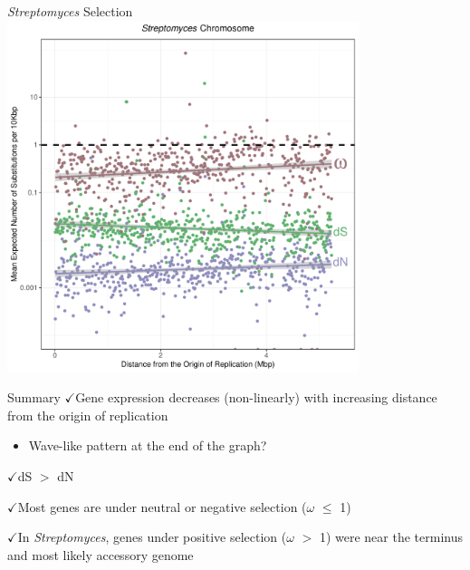 \documentclass{beamer}
\makeatletter
\newcommand{\bi}{\begin{itemize}}
\newcommand{\ei}{\end{itemize}}
\newcommand{\itm}{\item<itm@1->}
\newcommand{\strep}{\textit{Streptomyces}\xspace}
\newcommand{\ch}{$\checkmark$}
\makeatother
\begin{document}
\begin{frame}{\strep Selection}
	\centering
	\includegraphics[width=0.77\textwidth]{strep_selection.pdf}
\end{frame}

\begin{frame}{Summary}
	\ch Gene expression decreases (non-linearly) with increasing distance from the origin of replication
	\bi
	\itm  Wave-like pattern at the end of the graph?
	\ei

	\ch dS $>$ dN

	\ch Most genes are under neutral or negative selection ($\omega$ $\le$ 1)

	\ch In \strep, genes under positive selection ($\omega$ $>$ 1) were near the terminus and most likely accessory genome
\end{frame}
\end{document}
